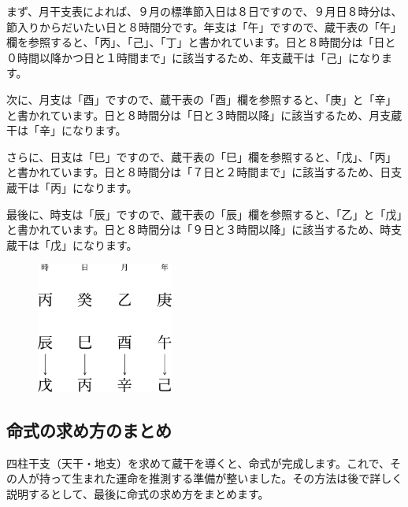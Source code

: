 \documentclass[a5paper,11pt,dvipdfmx]{tarticle}
\begin{document}
まず、月干支表によれば、９月の標準節入日は８日ですので、９月日８時分は、節入りからだいたい日と８時間分です。年支は「午」ですので、蔵干表の「午」欄を参照すると、「丙」、「己」、「丁」と書かれています。日と８時間分は「日と０時間以降かつ日と１時間まで」に該当するため、年支蔵干は「己」になります。

次に、月支は「酉」ですので、蔵干表の「酉」欄を参照すると、「庚」と「辛」と書かれています。日と８時間分は「日と３時間以降」に該当するため、月支蔵干は「辛」になります。

さらに、日支は「巳」ですので、蔵干表の「巳」欄を参照すると、「戊」、「丙」と書かれています。日と８時間分は「７日と２時間まで」に該当するため、日支蔵干は「丙」になります。

最後に、時支は「辰」ですので、蔵干表の「辰」欄を参照すると、「乙」と「戊」と書かれています。日と８時間分は「９日と３時間以降」に該当するため、時支蔵干は「戊」になります。

\begin{figure}[h]
  \includegraphics[width=45mm,angle=90]{figs/figure3-11.eps}
\end{figure}

\subsection{命式の求め方のまとめ}
四柱干支（天干・地支）を求めて蔵干を導くと、命式が完成します。これで、その人が持って生まれた運命を推測する準備が整いました。その方法は後で詳しく説明するとして、最後に命式の求め方をまとめます。
\end{document}
